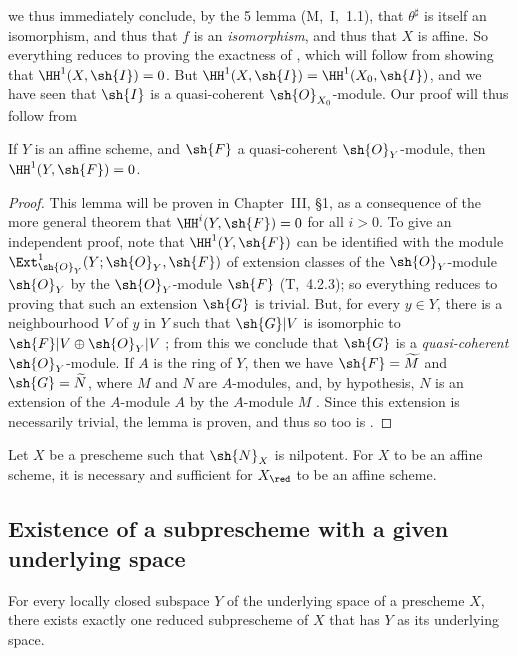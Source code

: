 we thus immediately conclude, by the 5 lemma (M,~I,~1.1), that $\theta^\sharp$ is itself an isomorphism, and thus that $f$ is an \emph{isomorphism}, and thus that $X$ is affine.
So everything reduces to proving the exactness of , which will follow from showing that $\HH^1(X,\sh{I})=0$.
But $\HH^1(X,\sh{I})=\HH^1(X_0,\sh{I})$, and we have seen that $\sh{I}$ is a quasi-coherent $\sh{O}_{X_0}$-module.
Our proof will thus follow from
\begin{lemma}[5.1.9.2]
\label{I.5.1.9.2}
If $Y$ is an affine scheme, and $\sh{F}$ a quasi-coherent $\sh{O}_Y$-module, then $\HH^1(Y,\sh{F})=0$.
\end{lemma}

\begin{proof}
This lemma will be proven in Chapter~III, §1, as a consequence of the more general theorem that $\HH^i(Y,\sh{F})=0$ for all $i>0$.
To give an independent proof, note that $\HH^1(Y,\sh{F})$ can be identified with the module $\Ext_{\sh{O}_Y}^1(Y;\sh{O}_Y,\sh{F})$ of extension classes of the $\sh{O}_Y$-module $\sh{O}_Y$ by the $\sh{O}_Y$-module $\sh{F}$ (T,~4.2.3);
so everything reduces to proving that such an extension $\sh{G}$ is trivial.
But, for every $y\in Y$, there is a neighbourhood $V$ of $y$ in $Y$ such that $\sh{G}|V$ is isomorphic to $\sh{F}|V\oplus\sh{O}_Y|V$ ;
from this we conclude that $\sh{G}$ is a \emph{quasi-coherent} $\sh{O}_Y$-module.
If $A$ is the ring of $Y$, then we have $\sh{F}=\widetilde{M}$ and $\sh{G}=\widetilde{N}$, where $M$ and $N$ are $A$-modules, and, by hypothesis, $N$ is an extension of the $A$-module $A$ by the $A$-module $M$ .
Since this extension is necessarily trivial, the lemma is proven, and thus so too is .
\end{proof}

\begin{corollary}[5.1.10]
\label{I.5.1.10}
Let $X$ be a prescheme such that $\sh{N}_X$ is nilpotent.
For $X$ to be an affine scheme, it is necessary and sufficient for $X_\red$ to be an affine scheme.
\end{corollary}

\subsection{Existence of a subprescheme with a given underlying space}
\label{subsection:I.5.2}

\begin{proposition}[5.2.1]
\label{I.5.2.1}
For every locally closed subspace $Y$ of the underlying space of a prescheme $X$, there exists exactly one reduced subprescheme of $X$ that has $Y$ as its underlying space.
\end{proposition}

